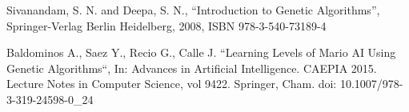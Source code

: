 \documentclass[conference]{IEEEtran}
\begin{document}
\begin{thebibliography}{00}

Sivanandam, S. N. and Deepa, S. N., ``Introduction to Genetic Algorithms'',
	Springer-Verlag Berlin Heidelberg, 2008, ISBN 978-3-540-73189-4
	

Baldominos A., Saez Y., Recio G., Calle J. ``Learning Levels of Mario AI Using Genetic Algorithms``,
	In: Advances in Artificial Intelligence. CAEPIA 2015. Lecture Notes in Computer Science, vol 9422. Springer, Cham. doi: 10.1007/978-3-319-24598-0\_24


%
%
%
%
%
%
%
%
%
%

\end{thebibliography}
\end{document}
